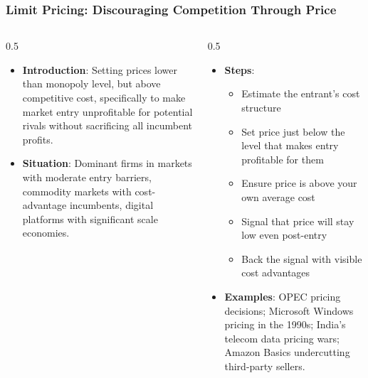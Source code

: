 \begin{frame}[fragile]\frametitle{Limit Pricing: Discouraging Competition Through Price}
\begin{columns}
    \begin{column}[T]{0.5\linewidth}
      \begin{itemize}
        \item \textbf{Introduction}: Setting prices lower than monopoly level, but above competitive cost, specifically to make market entry unprofitable for potential rivals without sacrificing all incumbent profits.
        \item \textbf{Situation}: Dominant firms in markets with moderate entry barriers, commodity markets with cost-advantage incumbents, digital platforms with significant scale economies.
      \end{itemize}
    \end{column}
    \begin{column}[T]{0.5\linewidth}
      \begin{itemize}
        \item \textbf{Steps}:
        \begin{itemize}
          \item Estimate the entrant's cost structure
          \item Set price just below the level that makes entry profitable for them
          \item Ensure price is above your own average cost
          \item Signal that price will stay low even post-entry
          \item Back the signal with visible cost advantages
        \end{itemize}\item \textbf{Examples}: OPEC pricing decisions; Microsoft Windows pricing in the 1990s; India's telecom data pricing wars; Amazon Basics undercutting third-party sellers.
      \end{itemize}
    \end{column}
  \end{columns}
\end{frame}

